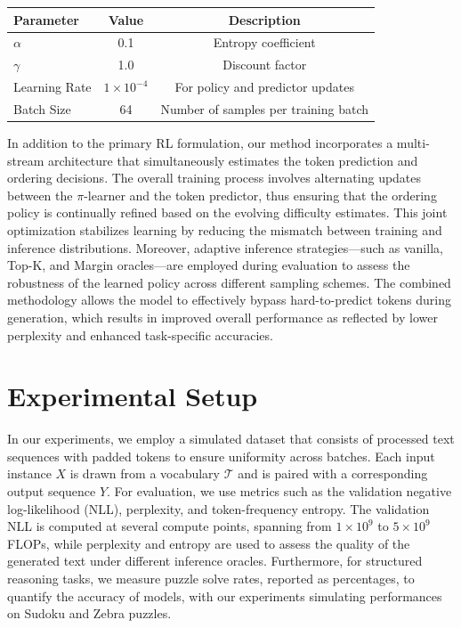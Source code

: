 \documentclass{article} %
\begin{document}
\begin{center}
\begin{tabular}{lcc}
\hline
Parameter & Value & Description \\
\hline
\( \alpha \) & 0.1 & Entropy coefficient \\
\( \gamma \) & 1.0 & Discount factor \\
Learning Rate & \( 1 \times 10^{-4} \) & For policy and predictor updates \\
Batch Size & 64 & Number of samples per training batch \\
\hline
\end{tabular}
\end{center}

In addition to the primary RL formulation, our method incorporates a multi-stream architecture that simultaneously estimates the token prediction and ordering decisions. The overall training process involves alternating updates between the $\pi$-learner and the token predictor, thus ensuring that the ordering policy is continually refined based on the evolving difficulty estimates. This joint optimization stabilizes learning by reducing the mismatch between training and inference distributions. Moreover, adaptive inference strategies—such as vanilla, Top-K, and Margin oracles—are employed during evaluation to assess the robustness of the learned policy across different sampling schemes. The combined methodology allows the model to effectively bypass hard-to-predict tokens during generation, which results in improved overall performance as reflected by lower perplexity and enhanced task-specific accuracies.

\section{Experimental Setup}
In our experiments, we employ a simulated dataset that consists of processed text sequences with padded tokens to ensure uniformity across batches. Each input instance \(X\) is drawn from a vocabulary \(\mathcal{T}\) and is paired with a corresponding output sequence \(Y\). For evaluation, we use metrics such as the validation negative log-likelihood (NLL), perplexity, and token-frequency entropy. The validation NLL is computed at several compute points, spanning from \(1 \times 10^9\) to \(5 \times 10^9\) FLOPs, while perplexity and entropy are used to assess the quality of the generated text under different inference oracles. Furthermore, for structured reasoning tasks, we measure puzzle solve rates, reported as percentages, to quantify the accuracy of models, with our experiments simulating performances on Sudoku and Zebra puzzles.
\end{document}
